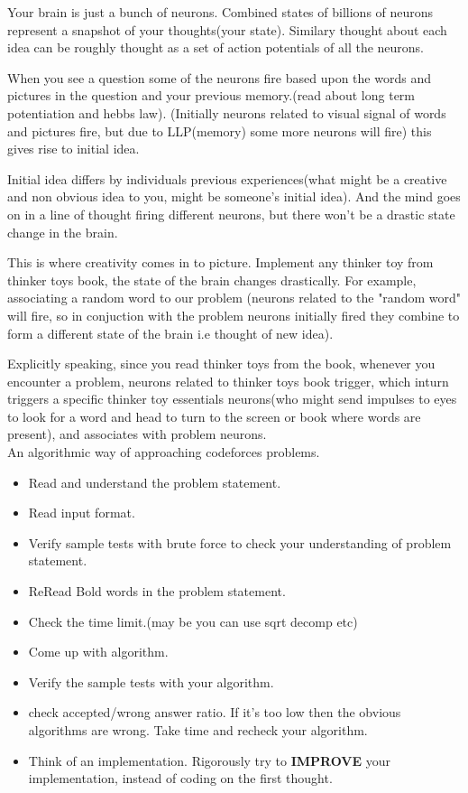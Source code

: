 \documentclass[a4paper,12pt]{report}
\begin{document}
Your brain is just a bunch of neurons. Combined states of billions of neurons represent a snapshot of your thoughts(your state). Similary thought about each idea can be roughly thought as a set of action potentials of all the neurons.

When you see a question some of the neurons fire based upon the  words and pictures in the question and your previous memory.(read about long term potentiation and hebbs law). (Initially neurons related to visual signal of words and pictures fire, but due to LLP(memory) some more neurons will fire) this gives rise to initial idea.

Initial idea differs by individuals previous experiences(what might be a creative and non obvious idea to you, might be someone's initial idea). And the mind goes on in a line of thought firing different neurons, but there won't be a drastic state change in the brain.

This is where creativity comes in to picture. Implement any thinker toy from thinker toys book, the state of the brain changes drastically. For example, associating a random word to our problem (neurons related to the "random word" will fire, so in conjuction with the problem neurons initially fired they combine to form a different state of the brain i.e thought of new idea).

Explicitly speaking, since you read thinker toys from the book, whenever you encounter a problem, neurons related to thinker toys book trigger, which inturn triggers a specific thinker toy essentials neurons(who might send impulses to eyes to look for a word and head to turn to the screen or book where words are present), and associates with problem neurons.\\

An algorithmic way of approaching codeforces problems.
\begin{itemize}
	\item Read and understand the problem statement.
	\item Read input format.
	\item Verify sample tests with brute force to check your understanding of problem statement.
	\item ReRead Bold words in the problem statement.
	\item Check the time limit.(may be you can use sqrt decomp etc)
	\item Come up with algorithm.
	\item Verify the sample tests with your algorithm.
	\item check accepted/wrong answer ratio. If it's too low then the obvious algorithms are wrong. Take time and recheck your algorithm.
	\item Think of an implementation. Rigorously try to \textbf{IMPROVE} your implementation, instead of coding on the first thought. 
\end{itemize}
\end{document}

